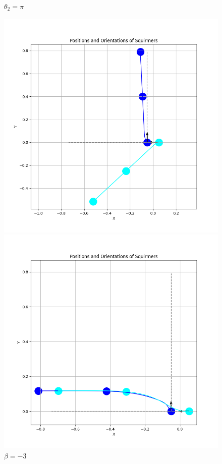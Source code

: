 \documentclass{article}
\begin{document}
\begin{figure}[H]
    \centering
    \textbf{$\theta_2 = \pi$}\par\medskip
    \begin{minipage}{0.49\textwidth}
        \includegraphics[width=1.1\textwidth]{graphs/simulations/sim_sq_sq/betam3/pi_.png}
        \caption{\footnotesize $\beta = -3$}
    \end{minipage}\hfill
    \begin{minipage}{0.49\textwidth}
        \includegraphics[width=1.1\textwidth]{graphs/simulations/sim_sq_sq/beta3/pi_.png}

\end{minipage}
\end{figure}
\end{document}
